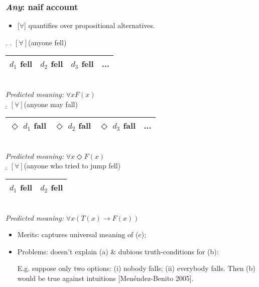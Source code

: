 \documentclass{beamer}
\newcommand\notext[1]{}
\newcommand{\bit}{\begin{itemize}}
\newcommand{\eit}{\end{itemize}}
\newcommand{\btar}{\begin{tabular}}
\newcommand{\etar}{\end{tabular}}
\begin{document}
\frame
{\frametitle{{\it Any}: naif account}

\bit
\item {\small [$\forall$] quantifies over  propositional alternatives.}
\eit
  \ex.\label{naif} \a. $[\forall]$(anyone fell) \hfill
    {\scriptsize \btar{|c|c|c|c|}  \hline $d_1$ fell  &   $d_2$ fell  & $d_3$ fell & ...
 \\
  \hline
\etar
  } \\ \vspace{0,2cm} {\it Predicted meaning:} $\forall x   F(x)$   
  \\ $ \; $ \\
 \b.  $[\forall]$(anyone may fall)  \hfill
  {\scriptsize \btar{|c|c|c|c|}  \hline $\Diamond $ $d_1$ fall  &  $\Diamond $ $d_2$ fall  & $\Diamond $ $d_3$ fall & ...
 \\
  \hline
\etar
  }  \\ \vspace{0,2cm}   {\it Predicted meaning:}  $  \forall x \Diamond F(x)$ 
  \\ $ \; $ \\ \b.   $[\forall]$(anyone
who tried to jump fell) \hfill
   {\scriptsize \btar{|c|c|}  \hline $d_1$ fell  &     $d_2$ fell     \\
 \hline
\etar
  }
\\ \vspace{0,2cm}  {\it Predicted meaning:} $\forall x(T(x) \to F(x))$  

\bit
\item {\sc Merits:} captures universal meaning of (c);
\item {\sc Problems:}
   doesn't explain (a)  \&  dubious truth-conditions for (b):

 \vspace{0,1cm}

 {\small E.g. suppose only two options: (i) nobody falls; (ii) everybody falls. Then (b) would be true against intuitions [Men\'endez-Benito 2005].}

\notext{
{\small

\es{You may take any of the cards.  \label{canasta} \hfill [Men\'endez-Benito 2005]}
Suppose only two options: (i) take no cards (ii) take all cards. Then (\ref{canasta}) would be true against intuitions.}}
\eit

}
\end{document}
